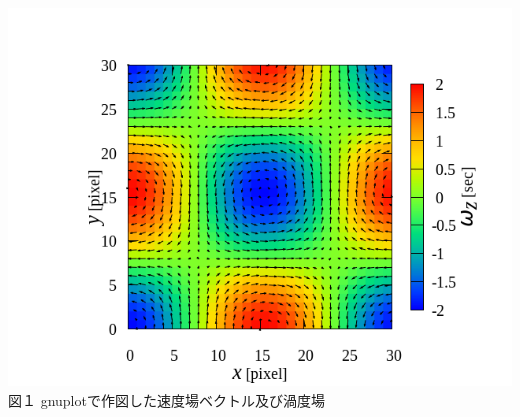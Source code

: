 \documentclass[12pt,a4paper]{jsarticle}
\begin{document}
\begin{center}
    \includegraphics[width=150mm]{2dvec_vortex_map000001.png}
    \large
    \\ 図１ gnuplotで作図した速度場ベクトル及び渦度場
\end{center}
\end{document}
